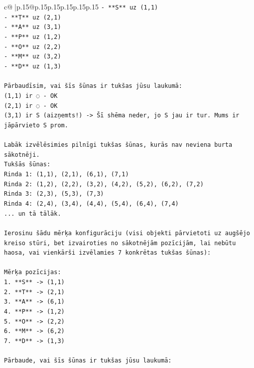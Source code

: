 \documentclass{article}
\begin{document}
{\begin{supertabular}{c@{$\;$}|p{.15\linewidth}@{}p{.15\linewidth}p{.15\linewidth}p{.15\linewidth}p{.15\linewidth}p{.15\linewidth}}
{{{\texttt{{-} **S** uz (1,1)} \\
\texttt{{-} **T** uz (2,1)} \\
\texttt{{-} **A** uz (3,1)} \\
\texttt{{-} **P** uz (1,2)} \\
\texttt{{-} **O** uz (2,2)} \\
\texttt{{-} **M** uz (3,2)} \\
\texttt{{-} **D** uz (1,3)} \\
\\ 
\texttt{Pārbaudīsim, vai šīs šūnas ir tukšas jūsu laukumā:} \\
\texttt{(1,1) ir ◌ {-} OK} \\
\texttt{(2,1) ir ◌ {-} OK} \\
\texttt{(3,1) ir S (aizņemts!) {-}> Šī shēma neder, jo S jau ir tur. Mums ir jāpārvieto S prom.} \\
\\ 
\texttt{Labāk izvēlēsimies pilnīgi tukšas šūnas, kurās nav neviena burta sākotnēji.} \\
\texttt{Tukšās šūnas:} \\
\texttt{Rinda 1: (1,1), (2,1), (6,1), (7,1)} \\
\texttt{Rinda 2: (1,2), (2,2), (3,2), (4,2), (5,2), (6,2), (7,2)} \\
\texttt{Rinda 3: (2,3), (5,3), (7,3)} \\
\texttt{Rinda 4: (2,4), (3,4), (4,4), (5,4), (6,4), (7,4)} \\
\texttt{... un tā tālāk.} \\
\\ 
\texttt{Ierosinu šādu mērķa konfigurāciju (visi objekti pārvietoti uz augšējo kreiso stūri, bet izvairoties no sākotnējām pozīcijām, lai nebūtu haosa, vai vienkārši izvēlamies 7 konkrētas tukšas šūnas):} \\
\\ 
\texttt{Mērķa pozīcijas:} \\
\texttt{1. **S** {-}> (1,1)} \\
\texttt{2. **T** {-}> (2,1)} \\
\texttt{3. **A** {-}> (6,1)} \\
\texttt{4. **P** {-}> (1,2)} \\
\texttt{5. **O** {-}> (2,2)} \\
\texttt{6. **M** {-}> (6,2)} \\
\texttt{7. **D** {-}> (1,3)} \\
\\ 
\texttt{Pārbaude, vai šīs šūnas ir tukšas jūsu laukumā:} \\
}}}
\end{supertabular}}
\end{document}
